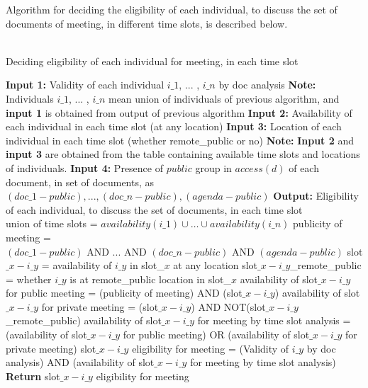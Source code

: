 Algorithm for deciding the eligibility of each individual, to discuss the set of documents of meeting, in different time slots, is described below.\\ \\
\begin{algorithm}[H]
    \caption{Deciding eligibility of each individual for meeting, in each time slot}
    \begin{algorithmic}[1]
        \State \textbf{Input 1:} Validity of each individual \(i\_1\), ... , \(i\_n\) by doc analysis
        \State \textbf{Note:} Individuals \(i\_1\), ... , \(i\_n\) mean union of individuals of previous algorithm, and \textbf{input 1} is obtained from output of previous algorithm
        \State \textbf{Input 2:} Availability of each individual in each time slot (at any location) 
        \State \textbf{Input 3:} Location of each individual in each time slot (whether remote\_public or no)
        \State \textbf{Note:} \textbf{Input 2} and \textbf{input 3} are obtained from the table containing available time slots and locations of individuals.
        \State \textbf{Input 4:} Presence of \(public\) group in \(access(d)\) of each document, in set of documents, as $(doc\_1-public) , ... , (doc\_n-public) , (agenda-public)$
        \State \textbf{Output:} Eligibility of each individual, to discuss the set of documents, in each time slot \\
        \State union of time slots = \(availability(i\_1) \cup \dots \cup availability(i\_n)\)
                \State publicity of meeting = \((doc\_1-public) \text{ AND } ... \text{ AND } (doc\_n-public) \text{ AND } (agenda-public)\)
                \State slot\(\_x-i\_y\) = availability of \(i\_y\) in slot\_\(x\) at any location
                \State slot\(\_x-i\_y\)\_remote\_public = whether \(i\_y\) is at remote\_public location in slot\_\(x\) 
                \State availability of slot\(\_x-i\_y\) for public meeting = (publicity of meeting) AND (slot\(\_x-i\_y\))
                \State availability of slot\(\_x-i\_y\) for private meeting = (slot\(\_x-i\_y\)) AND NOT(slot\(\_x-i\_y\)\_remote\_public)
                \State availability of slot\(\_x-i\_y\) for meeting by time slot analysis = (availability of slot\(\_x-i\_y\) for public meeting) OR (availability of slot\(\_x-i\_y\) for private meeting)
                \State slot\(\_x-i\_y\) eligibility for meeting = (Validity of \(i\_y\) by doc analysis) AND (availability of slot\(\_x-i\_y\) for meeting by time slot analysis)
            \EndFor
            \State \textbf{Return} slot\(\_x-i\_y\) eligibility for meeting
        \EndFor
    \end{algorithmic}
\end{algorithm}
